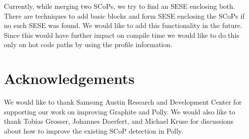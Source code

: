 \documentclass{sigplanconf}
\begin{document}
Currently, while merging two SCoPs, we try to find an SESE enclosing both.
There are techniques to add basic blocks and form SESE enclosing the SCoPs if no
such SESE was found.  We would like to add this functionality in the future.
Since this would have further impact on compile time we would like to do this
only on hot code paths by using the profile information.

\section{Acknowledgements}
We would like to thank Samsung Austin Research and Development Center for
supporting our work on improving Graphite and Polly.  We would also like to
thank Tobias Grosser, Johannes Doerfert, and Michael Kruse for discussions about
how to improve the existing SCoP detection in Polly.


{\small

}
\end{document}

